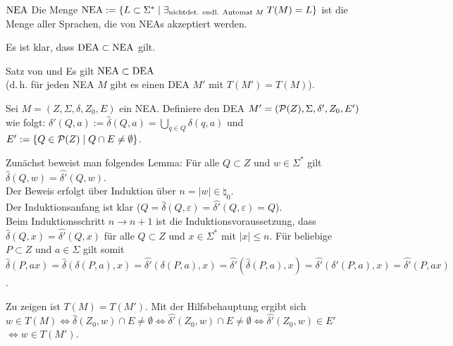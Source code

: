 \begin{Def}{$\NEA$}
    Die Menge $\NEA := \{L \subset \Sigma^\ast \;|\;
    \exists_{\text{nichtdet. endl. Automat } M}\; T(M) = L\}$
    ist die Menge aller Sprachen, die von NEAs akzeptiert werden.
\end{Def}

\begin{Bem}
    Es ist klar, dass $\DEA \subset \NEA$ gilt.
\end{Bem}

\begin{Satz}{Satz von  und }
    Es gilt $\NEA \subset \DEA$\\
    (d.\,h. für jeden NEA $M$ gibt es einen DEA $M'$ mit $T(M') = T(M)$).
\end{Satz}

\begin{Beweis}
    Sei $M = (Z, \Sigma, \delta, Z_0, E)$ ein NEA.
    Definiere den DEA $M' = (\P(Z), \Sigma, \delta', Z_0, E')$ wie folgt:
    $\delta'(Q, a) := \widehat{\delta}(Q, a) =
    \bigcup_{q \in Q} \delta(q, a)$ und
    $E' := \{Q \in \P(Z) \;|\; Q \cap E \not= \emptyset\}$.

    Zunächst beweist man folgendes Lemma:
    Für alle $Q \subset Z$ und $w \in \Sigma^\ast$ gilt
    $\widehat{\delta}(Q, w) = \widehat{\delta'}(Q, w)$.\\
    Der Beweis erfolgt über Induktion über $n = |w| \in \natural_0$.\\
    Der Induktionsanfang ist klar
    ($Q = \widehat{\delta}(Q, \varepsilon) =
    \widehat{\delta'}(Q, \varepsilon) = Q$).\\
    Beim Induktionsschritt $n \rightarrow n + 1$ ist die
    Induktionsvoraussetzung, dass
    $\widehat{\delta}(Q, x) = \widehat{\delta'}(Q, x)$
    für alle $Q \subset Z$ und $x \in \Sigma^\ast$ mit $|x| \le n$.
    Für beliebige $P \subset Z$ und $a \in \Sigma$ gilt somit\\
    $\widehat{\delta}(P, ax) =
    \widehat{\delta}(\delta(P, a), x) =
    \widehat{\delta'}(\delta(P, a), x) =
    \widehat{\delta'}(\widehat{\delta}(P, a), x) =
    \widehat{\delta'}(\delta'(P, a), x) =
    \widehat{\delta'}(P, ax)$.

    Zu zeigen ist $T(M) = T(M')$.
    Mit der Hilfsbehauptung ergibt sich\\
    $w \in T(M)
    \iff \widehat{\delta}(Z_0, w) \cap E \not= \emptyset
    \iff \widehat{\delta'}(Z_0, w) \cap E \not= \emptyset
    \iff \widehat{\delta'}(Z_0, w) \in E'$\\
    $\iff w \in T(M')$.
\end{Beweis}

